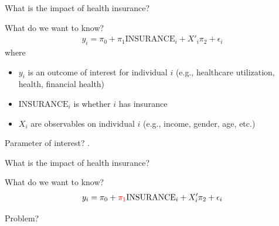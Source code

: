 \begin{frame}{What is the impact of health insurance?}

    What do we want to know?
    \begin{align*}
        y_{i} = \pi_0 + \pi_1 \text{INSURANCE}_i + X'_{i} \pi_2 + \epsilon_{i}
    \end{align*}
    where
    \begin{itemize}
        \item $y_i$ is an outcome of interest for individual $i$ (e.g., healthcare utilization, health, financial health)
        \item $\text{INSURANCE}_i$ is whether $i$ has insurance
        \item $X_i$ are observables on individual $i$ (e.g., income, gender, age, etc.)
    \end{itemize}
    \vspace{2mm}

    Parameter of interest? .
    
\end{frame}
\begin{frame}{What is the impact of health insurance?}

    What do we want to know?
    \begin{align*}
        y_{i} = \pi_0 + {\color{red} \pi_1} \text{INSURANCE}_i + X'_{i} \pi_2 + \epsilon_{i}
    \end{align*}
    \vspace{3mm}

    Problem? 


\end{frame}
